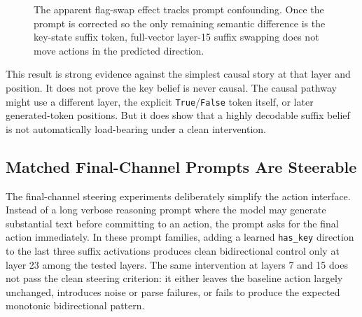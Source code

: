 \documentclass[11pt]{article}
\begin{document}
\begin{figure}[t]
\centering
{}
\caption{The apparent flag-swap effect tracks prompt confounding. Once the prompt is corrected so the only remaining semantic difference is the key-state suffix token, full-vector layer-15 suffix swapping does not move actions in the predicted direction.}
\label{fig:flag_swap}
\end{figure}

This result is strong evidence against the simplest causal story at that layer and position.
It does not prove the key belief is never causal.
The causal pathway might use a different layer, the explicit \texttt{True}/\texttt{False} token itself, or later generated-token positions.
But it does show that a highly decodable suffix belief is not automatically load-bearing under a clean intervention.
\FloatBarrier

\subsection{Matched Final-Channel Prompts Are Steerable}

The final-channel steering experiments deliberately simplify the action interface.
Instead of a long verbose reasoning prompt where the model may generate substantial text before committing to an action, the prompt asks for the final action immediately.
In these prompt families, adding a learned \texttt{has\_key} direction to the last three suffix activations produces clean bidirectional control only at layer 23 among the tested layers.
The same intervention at layers 7 and 15 does not pass the clean steering criterion: it either leaves the baseline action largely unchanged, introduces noise or parse failures, or fails to produce the expected monotonic bidirectional pattern.
\end{document}
